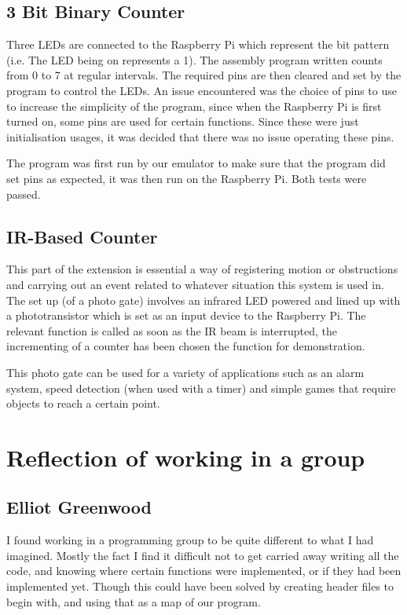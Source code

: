 \documentclass[11pt]{article}
\begin{document}
\subsection{3 Bit Binary Counter}
 Three LEDs are connected to the Raspberry Pi which represent the bit pattern (i.e. The LED being on represents a 1). The assembly program written counts from 0 to 7 at regular intervals. The required pins are then cleared and set by the program to control the LEDs. An issue encountered was the choice of pins to use to increase the simplicity of the program, since when the Raspberry Pi is first turned on, some pins are used for certain functions. Since these were just initialisation usages, it was decided that there was no issue operating these pins.

 The program was first run by our emulator to make sure that the program did set pins as expected, it was then run on the Raspberry Pi. Both tests were passed.

\subsection{IR-Based Counter}
This part of the extension is essential a way of registering motion or obstructions and carrying out an event related to whatever situation this system is used in. The set up (of a photo gate) involves an infrared LED powered and lined up with a phototransistor which is set as an input device to the Raspberry Pi. The relevant function is called as soon as the IR beam is interrupted, the incrementing of a counter has been chosen the function for demonstration.\newline

\noindent This photo gate can be used for a variety of applications such as an alarm system, speed detection (when used with a timer) and simple games that require objects to reach a certain point.\newline



\section{Reflection of working in a group}
\subsection{Elliot Greenwood}

I found working in a programming group to be quite different to what I had imagined. Mostly the fact I find it difficult not to get carried away writing all the code, and knowing where certain functions were implemented, or if they had been implemented yet. Though this could have been solved by creating header files to begin with, and using that as a map of our program. \newline
\end{document}
